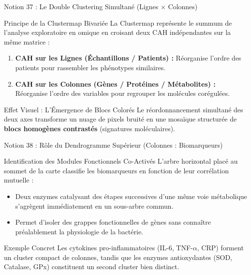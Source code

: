 \documentclass[aspectratio=169,10pt]{beamer}
\begin{document}
\begin{frame}{Notion 37 : Le Double Clustering Simultané (Lignes $\times$ Colonnes)}
  \begin{conceptbox}{Principe de la Clustermap Bivariée}
    \footnotesize
    La Clustermap représente le summum de l'analyse exploratoire en omique en croisant deux CAH indépendantes sur la même matrice :
    \begin{enumerate}
      \item \textbf{CAH sur les Lignes (Échantillons / Patients) :} Réorganise l'ordre des patients pour rassembler les phénotypes similaires.
      \item \textbf{CAH sur les Colonnes (Gènes / Protéines / Métabolites) :} Réorganise l'ordre des variables pour regrouper les molécules corégulées.
    \end{enumerate}
  \end{conceptbox}
  \vspace{1mm}
  \begin{takeawaybox}{Effet Visuel : L'Émergence de Blocs Colorés}
    \footnotesize
    Le réordonnancement simultané des deux axes transforme un nuage de pixels bruité en une mosaïque structurée de \textbf{blocs homogènes contrastés} (signatures moléculaires).
  \end{takeawaybox}
\end{frame}

\begin{frame}{Notion 38 : Rôle du Dendrogramme Supérieur (Colonnes : Biomarqueurs)}
  \begin{conceptbox}{Identification des Modules Fonctionnels Co-Activés}
    \footnotesize
    L'arbre horizontal placé au sommet de la carte classifie les biomarqueurs en fonction de leur corrélation mutuelle :
    \begin{itemize}
      \item Deux enzymes catalysant des étapes successives d'une même voie métabolique s'agrègent immédiatement en un sous-arbre commun.
      \item Permet d'isoler des grappes fonctionnelles de gènes sans connaître préalablement la physiologie de la bactérie.
    \end{itemize}
  \end{conceptbox}
  \vspace{1mm}
  \begin{biobox}{Exemple Concret}
    \footnotesize
    Les cytokines pro-inflammatoires (IL-6, TNF-$\alpha$, CRP) forment un cluster compact de colonnes, tandis que les enzymes antioxydantes (SOD, Catalase, GPx) constituent un second cluster bien distinct.
  \end{biobox}
\end{frame}
\end{document}
